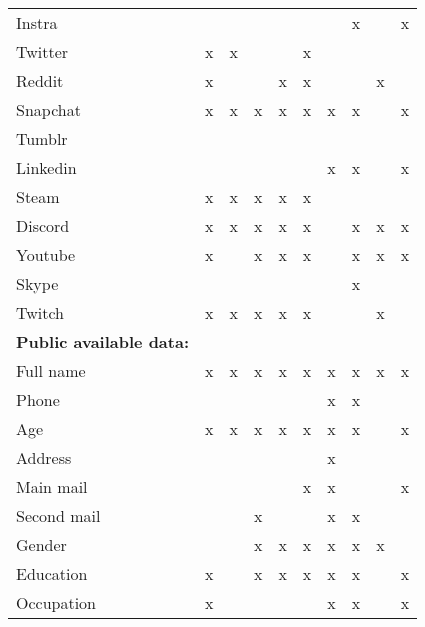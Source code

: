 \begin{table}
\begin{tabular}{llllllllll}
    Instra          &     &       &       &       &         &       & x    &     & x   \\
    Twitter         & x   & x     &       &       & x       &       &      &     &     \\
    Reddit          & x   &       &       & x     & x       &       &      & x   &     \\
    Snapchat        & x   & x     & x     & x     & x       & x     & x    &     & x   \\
    Tumblr          &     &       &       &       &         &       &      &     &     \\
    Linkedin        &     &       &       &       &         & x     & x    &     & x   \\
    Steam           & x   & x     & x     & x     & x       &       &      &     &     \\
    Discord         & x   & x     & x     & x     & x       &       & x    & x   & x   \\
    Youtube         & x   &       & x     & x     & x       &       & x    & x   & x   \\
    Skype           &     &       &       &       &         &       & x    &     &     \\
    Twitch          & x   & x     & x     & x     & x       &       &      & x   &     \\
    \textbf{Public available data:} &  &  &  &  &  &  &  &  & \\
    Full name       & x   & x     & x     & x     & x       & x     & x    & x   & x   \\
    Phone           &     &       &       &       &         & x     & x    &     &     \\
    Age             & x   & x     & x     & x     & x       & x     & x    &     & x   \\
    Address         &     &       &       &       &         & x     &      &     &     \\
    Main mail       &     &       &       &       & x       & x     &      &     & x   \\
    Second mail     &     &       & x     &       &         & x     & x    &     &     \\
    Gender          &     &       & x     & x     & x       & x     & x    & x   &     \\
    Education       & x   &       & x     & x     & x       & x     & x    &     & x   \\
    Occupation      & x   &       &       &       &         & x     & x    &     & x   \\

\end{tabular}
\end{table}
